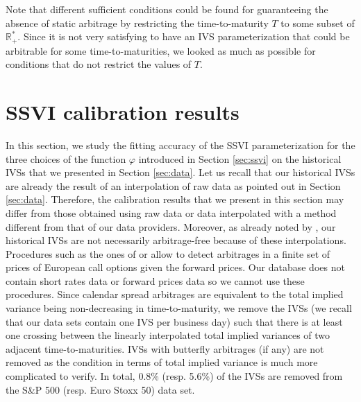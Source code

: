 \begin{remark}
Note that different sufficient conditions could be found for guaranteeing the absence of static arbitrage by restricting the time-to-maturity $T$ to some subset of $\mathbb{R}_+^*$. Since it is not very satisfying to have an IVS parameterization that could be arbitrable for some time-to-maturities, we looked as much as possible for conditions that do not restrict the values of $T$. 
\end{remark}



\section{SSVI calibration results}\label{sec:ssvi_calibration_results}
In this section, we study the fitting accuracy of the SSVI parameterization for the three choices of the function $\varphi$ introduced in Section \ref{sec:ssvi} on the historical IVSs that we presented in Section \ref{sec:data}. Let us recall that our historical IVSs are already the result of an interpolation of raw data as pointed out in Section \ref{sec:data}. Therefore, the calibration results that we present in this section may differ from those obtained using raw data or data interpolated with a method different from that of our data providers. Moreover, as already noted by \cite{cont2022simulation}, our historical IVSs are not necessarily arbitrage-free because of these interpolations. Procedures such as the ones of \cite{davis2007range} or \cite{cohen2020repairing} allow to detect arbitrages in a finite set of prices of European call options given the forward prices. Our database does not contain short rates data or forward prices data so we cannot use these procedures. Since calendar spread arbitrages are equivalent to the total implied variance being non-decreasing in time-to-maturity, we remove the IVSs (we recall that our data sets contain one IVS per business day) such that there is at least one crossing between the linearly interpolated total implied variances of two adjacent time-to-maturities. IVSs with butterfly arbitrages (if any) are not removed as the condition in terms of total implied variance is much more complicated to verify. In total, 0.8\% (resp. 5.6\%) of the IVSs are removed from the S\&P 500 (resp. Euro Stoxx 50) data set.  \\

